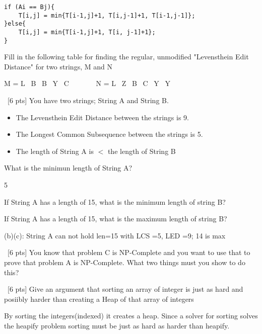 \documentclass[12pt]{article}
\newenvironment{sol}[1][Solution]{\begin{trivlist}\item[\hskip\labelsep {\bfseries #1:}]}{\end{trivlist}}
\begin{document}
\begin{enumerate}
\begin{enumerate}
\begin{sol}
\begin{verbatim}
if (Ai == Bj){
    T[i,j] = min{T[i-1,j]+1, T[i,j-1]+1, T[i-1,j-1]};
}else{
    T[i,j] = min{T[i-1,j]+1, T[i, j-1]+1};
}
\end{verbatim}
        \end{sol}
            \item Fill in the following table for finding the regular, unmodified "Levensthein Edit Distance" for two strings, M and N
            \begin{center}
                M = L \ B \ B \ Y \ C \ \ \ \ \ \ \ N = L \ Z \ B \ C \ Y \ Y
            \end{center}
        \end{enumerate}

        \item \ [6 pts] You have two strings; String A and String B.
        \begin{itemize}
        
            \item The Levensthein Edit Distance between the strings is 9.
            \item The Longest Common Subsequence between the strings is 5.
            \item The length of String A is $<$ the length of String B
        \end{itemize}
            \begin{enumerate}
                \item What is the minimun length of String A?
                \begin{sol}
                5
                \end{sol}
                \item If String A has a length of 15, what is the minimum length of string B?
                \item If String A has a length of 15, what is the maximum length of string B?
                \begin{sol}
                    (b)(c): String A can not hold len=15 with LCS =5, LED =9; 14 is max
                \end{sol}
            \end{enumerate}
        \item \ [6 pts] You know that problem C is NP-Complete and you want to use that to prove that problem A is NP-Complete. What two things must you show to do this?
        \item \ [6 pts] Give an argument that sorting an array of integer is just as hard and posiibly harder than creating a Heap of that array of integers
        \begin{sol}
            By sorting the integers(indexed) it creates a heap. Since a solver for sorting solves the heapify problem sorting must be just as hard as harder than heapify.
        \end{sol}


\end{enumerate}
\end{document}
